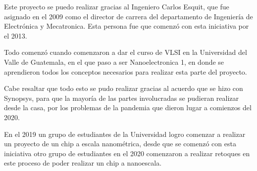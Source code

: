 

Este proyecto se puedo realizar gracias al Ingeniero Carlos Esquit, que fue asignado en el 2009 como el director de carrera del departamento de Ingeniería de Electrónica y Mecatronica. Esta persona fue que comenzó con esta iniciativa por el 2013.

Todo comenzó cuando comenzaron a dar el curso de VLSI en la Universidad del Valle de Guatemala, en el que paso a ser Nanoelectronica 1, en donde se aprendieron todos los conceptos necesarios para realizar esta parte del proyecto. 

Cabe resaltar que todo esto se pudo realizar gracias al acuerdo que se hizo con Synopsys, para que la mayoría de las partes involucradas se pudieran realizar desde la casa, por los problemas de la pandemia que dieron lugar a comienzos del 2020.

En el 2019 un grupo de estudiantes de la Universidad logro comenzar a realizar un proyecto de un chip a escala nanométrica, desde que se comenzó con esta iniciativa otro grupo de estudiantes en el 2020 comenzaron a realizar retoques en este proceso de poder realizar un chip a nanoescala.  \cite{hoover2010bio} \cite{park2014design}